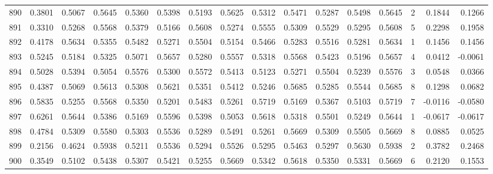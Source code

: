 \begin{tabular}{lrrrrrrrrrrrrrrr}
890 &      0.3801 &  0.5067 &  0.5645 &  0.5360 &  0.5398 &  0.5193 &  0.5625 &  0.5312 &  0.5471 &  0.5287 &   0.5498 &     0.5645 &      2 &                    0.1844 &                     0.1266 \\
891 &      0.3310 &  0.5268 &  0.5568 &  0.5379 &  0.5166 &  0.5608 &  0.5274 &  0.5555 &  0.5309 &  0.5529 &   0.5295 &     0.5608 &      5 &                    0.2298 &                     0.1958 \\
892 &      0.4178 &  0.5634 &  0.5355 &  0.5482 &  0.5271 &  0.5504 &  0.5154 &  0.5466 &  0.5283 &  0.5516 &   0.5281 &     0.5634 &      1 &                    0.1456 &                     0.1456 \\
893 &      0.5245 &  0.5184 &  0.5325 &  0.5071 &  0.5657 &  0.5280 &  0.5557 &  0.5318 &  0.5568 &  0.5423 &   0.5196 &     0.5657 &      4 &                    0.0412 &                    -0.0061 \\
894 &      0.5028 &  0.5394 &  0.5054 &  0.5576 &  0.5300 &  0.5572 &  0.5413 &  0.5123 &  0.5271 &  0.5504 &   0.5239 &     0.5576 &      3 &                    0.0548 &                     0.0366 \\
895 &      0.4387 &  0.5069 &  0.5613 &  0.5308 &  0.5621 &  0.5351 &  0.5412 &  0.5246 &  0.5685 &  0.5285 &   0.5544 &     0.5685 &      8 &                    0.1298 &                     0.0682 \\
896 &      0.5835 &  0.5255 &  0.5568 &  0.5350 &  0.5201 &  0.5483 &  0.5261 &  0.5719 &  0.5169 &  0.5367 &   0.5103 &     0.5719 &      7 &                   -0.0116 &                    -0.0580 \\
897 &      0.6261 &  0.5644 &  0.5386 &  0.5169 &  0.5596 &  0.5398 &  0.5053 &  0.5618 &  0.5318 &  0.5501 &   0.5249 &     0.5644 &      1 &                   -0.0617 &                    -0.0617 \\
898 &      0.4784 &  0.5309 &  0.5580 &  0.5303 &  0.5536 &  0.5289 &  0.5491 &  0.5261 &  0.5669 &  0.5309 &   0.5505 &     0.5669 &      8 &                    0.0885 &                     0.0525 \\
899 &      0.2156 &  0.4624 &  0.5938 &  0.5211 &  0.5536 &  0.5294 &  0.5526 &  0.5295 &  0.5463 &  0.5297 &   0.5630 &     0.5938 &      2 &                    0.3782 &                     0.2468 \\
900 &      0.3549 &  0.5102 &  0.5438 &  0.5307 &  0.5421 &  0.5255 &  0.5669 &  0.5342 &  0.5618 &  0.5350 &   0.5331 &     0.5669 &      6 &                    0.2120 &                     0.1553 \\

\end{tabular}
